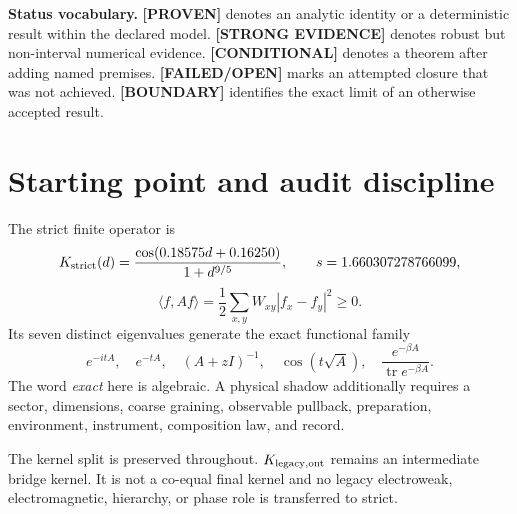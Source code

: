 \documentclass[11pt,a4paper]{article}
\newcommand{\proven}{\textcolor{green!40!black}{\textbf{[PROVEN]}}}
\newcommand{\strong}{\textcolor{blue!70!black}{\textbf{[STRONG EVIDENCE]}}}
\newcommand{\conditional}{\textcolor{black!60}{\textbf{[CONDITIONAL]}}}
\newcommand{\failed}{\textcolor{red!72!black}{\textbf{[FAILED/OPEN]}}}
\newcommand{\boundary}{\textcolor{orange!80!black}{\textbf{[BOUNDARY]}}}
\begin{document}
\begin{abstract}
ST11 proves exact Schur-elimination associativity to $3.5\times10^{-16}$ and shows that a declared truncation produces a $0.782\%$ scheme difference; this is not yet an RG fixed point. ST12 blocks all legacy physical-role transfer because completion and role-invariance theorems remain absent. ST13 validates a heat-calibrated, no-refit synthetic cross-channel pipeline and rejects an altered unitary holdout. ST14 preregisters and hashes a kernel fingerprint before a $5{,}000$-sample holdout; it has zero false accepts, but is rejected as a physical prediction because it restates the defining kernel formula. ST15 passes six symbolic, rational, and numerical core checks with an explicit non-proof-assistant boundary.

No single ``missing theorem'' was found. The remaining obstruction is a conjunction of independent missing objects: selector/algebra, dimensions, refinement, operational semantics, and external record. The strongest new constructive result is the coercive saturating mediator; the strongest new no-go is continuum nonidentifiability from $A_{12}$.
\end{abstract}

\textbf{Status vocabulary.} \proven{} denotes an analytic identity or a deterministic result within the declared model. \strong{} denotes robust but non-interval numerical evidence. \conditional{} denotes a theorem after adding named premises. \failed{} marks an attempted closure that was not achieved. \boundary{} identifies the exact limit of an otherwise accepted result.

\tableofcontents
\newpage

\section{Starting point and audit discipline}

The strict finite operator is
\[
K_{\rm strict}(d)=\frac{\cos(0.18575d+0.16250)}{1+d^{9/5}},\qquad
s=1.660307278766099,
\]
\[
\langle f,Af\rangle=\frac12\sum_{x,y}W_{xy}|f_x-f_y|^2\ge0.
\]
Its seven distinct eigenvalues generate the exact functional family
\[
e^{-itA},\quad e^{-tA},\quad (A+zI)^{-1},\quad
\cos(t\sqrt A),\quad \frac{e^{-\beta A}}{\operatorname{tr}e^{-\beta A}}.
\]
The word \emph{exact} here is algebraic. A physical shadow additionally requires a sector, dimensions, coarse graining, observable pullback, preparation, environment, instrument, composition law, and record.

The kernel split is preserved throughout. $K_{\rm legacy,ont}$ remains an intermediate bridge kernel. It is not a co-equal final kernel and no legacy electroweak, electromagnetic, hierarchy, or phase role is transferred to strict.
\end{document}

